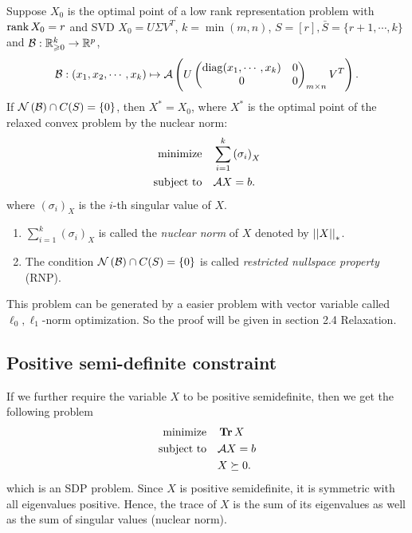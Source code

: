 \documentclass[11pt]{article}
\begin{document}
\begin{theorem}
    Suppose \(X_0\) is the optimal point of a low rank representation problem with \(\operatorname{rank} X_0=r\) and SVD \(X_0 = U\Sigma V^T\), \(k=\min(m,n)\), \(S=[r],\bar{S}=\{r+1,\cdots ,k\}\) and \(\mathcal{B}:\mathbb R^k_{\geqslant 0} \to \mathbb R^p\),
    \[\mathcal{B}:(x_1,x_2,\cdots,x_k) \mapsto \mathcal{A}\left( U \begin{pmatrix}
        \operatorname{diag}(x_1,\cdots,x_k) & 0 \\
        0 & 0
    \end{pmatrix}_{m\times n} V^T\right).\]
    If \(\mathcal N\left(\mathcal{B}\right)\cap C(S) = \{0\}\), then \(X^\ast=X_0\), where \(X^\ast\) is the optimal point of the relaxed convex problem by the nuclear norm: 
    \[\begin{aligned}
        \textnormal{minimize}\quad & \sum_{i=1}^k\left(\sigma_i\right)_X\\
        \textnormal{subject to}\quad & \mathcal AX=b.
    \end{aligned}\]
    where \((\sigma_i)_X\) is the \(i\)-th singular value of \(X\).
\end{theorem}

\begin{remark}
    \begin{enumerate}[(1)]
        \item \(\sum_{i=1}^{k} (\sigma_i)_X\) is called the \emph{nuclear norm} of \(X\) denoted by \(\left|\left|X\right|\right|_\ast\).
        \item The condition \(\mathcal N\left(\mathcal{B}\right)\cap C(S) = \{0\}\) is called \emph{restricted nullspace property} (RNP).
    \end{enumerate}
\end{remark}

This problem can be generated by a easier problem with vector variable called \(\ell_0,\ell_1\)-norm optimization. So the proof will be given in section 2.4 Relaxation.

\subsection{Positive semi-definite constraint}

If we further require the variable \(X\) to be positive semidefinite, then we get the following problem 
\[\begin{aligned}
    \textnormal{minimize}\quad & \operatorname{\mathbf{Tr}} X\\
    \textnormal{subject to}\quad & \mathcal AX=b\\
    & X\succeq 0.
\end{aligned}\]
which is an SDP problem. Since \(X\) is positive semidefinite, it is symmetric with all eigenvalues positive. Hence, the trace of \(X\) is the sum of its eigenvalues as well as the sum of singular values (nuclear norm).
\end{document}
